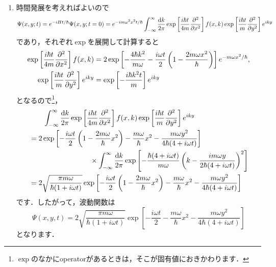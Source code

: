 \documentclass[a4paper,pdflatex,ja=standard]{bxjsarticle}
\begin{document}
\begin{enumerate}
  \item 
  時間発展を考えればよいので
  \begin{equation}
    \Psi(x,y;t)
    =
    e^{-iHt/\hbar}\Psi(x,y;t=0)
    =
    e^{-im\omega^2x^2t/\hbar}
    \int_{-\infty}^{\infty}
    \frac{\dd k}{2\pi}
    \exp\left[ \frac{i\hbar t}{4m}\pdv[2]{}{x} \right]f(x,k)
    \exp\left[ \frac{i\hbar t}{m}\pdv[2]{}{y} \right]e^{iky}
  \end{equation}
  であり，それぞれ$\exp$を展開して計算すると
  \begin{align}
    \exp\left[ \frac{i\hbar t}{4m}\pdv[2]{}{x} \right]f(x,k)
    &=
    2\exp\left[ -\frac{4\hbar k^2}{m\omega}-\frac{i\omega t}{2}\left( 1-\frac{2m\omega x^2}{\hbar} \right) \right]e^{-m\omega x^2/\hbar}
    ,
    \\  
    \exp\left[ \frac{i\hbar t}{m}\pdv[2]{}{y} \right]e^{iky}
    &=
    \exp\left[ -\frac{i\hbar k^2t}{m} \right]e^{iky}
  \end{align}
  となるので\footnote{
    $\exp$のなかにoperatorがあるときは，そこが固有値におきかわります．
  }，
  \begin{align}
    &\hspace*{20pt}
    \int_{-\infty}^{\infty}
    \frac{\dd k}{2\pi}
    \exp\left[ \frac{i\hbar t}{4m}\pdv[2]{}{x} \right]f(x,k)
    \exp\left[ \frac{i\hbar t}{m}\pdv[2]{}{y} \right]e^{iky}
    \nonumber
    \\
    &=
    2\exp
    \left[  
      -\frac{i\omega t}{2}
      \left(  
        1
        -
        \frac{2m\omega}{\hbar}x^2
      \right)
      -
      \frac{m\omega}{\hbar}x^2
      -
      \frac{m\omega y^2}{4\hbar(4+i\omega t)}
    \right]
    \nonumber
    \\
    &\hspace*{3cm}
    \times
    \int_{-\infty}^{\infty}
    \frac{\dd k}{2\pi}
    \exp
    \left[  
      -
      \frac{\hbar(4+i\omega t)}{m\omega}
      \left(  
        k-\frac{im\omega y}{2\hbar(4+i\omega t)}
      \right)^2
    \right]
    \nonumber
    \\
    &=
    2
    \sqrt{\frac{\pi m\omega}{\hbar(1+i\omega t)}}
    \exp
    \left[  
      -\frac{i\omega t}{2}
      \left(  
        1
        -
        \frac{2m\omega}{\hbar}x^2
      \right)
      -
      \frac{m\omega}{\hbar}x^2
      -
      \frac{m\omega y^2}{4\hbar(4+i\omega t)}
    \right]
  \end{align}
  です．したがって，波動関数は
  \begin{equation}
    \Psi(x,y,t)
    =
    2
    \sqrt{\frac{\pi m\omega}{\hbar(1+i\omega t)}}
    \exp
    \left[  
      -\frac{i\omega t}{2}
      -
      \frac{m\omega}{\hbar}x^2
      -
      \frac{m\omega y^2}{4\hbar(4+i\omega t)}
    \right]
  \end{equation}
  となります．

\end{enumerate}
\end{document}
